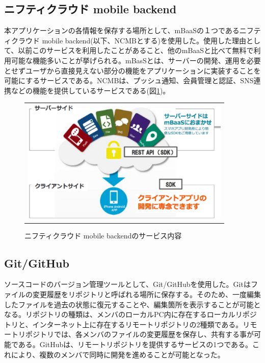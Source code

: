 \subsection{ニフティクラウド mobile backend}%
本アプリケーションの各情報を保存する場所として、mBaaSの１つであるニフティクラウド mobile backend(以下、NCMBとする)を使用した。使用した理由として、以前このサービスを利用したことがあること、他のmBaaSと比べて無料で利用可能な機能多いことが挙げられる。mBasSとは、サーバーの開発、運用を必要とせずユーザから直接見えない部分の機能をアプリケーションに実装することを可能にするサービスである\cite{about_mbaas}。NCMBは、プッシュ通知、会員管理と認証、SNS連携などの機能\cite{price_mbaas}を提供しているサービスである(図\ref{fig:image_mbaas})。

\begin{figure}[htbp]
  \begin{center}
    \begin{tabular}{c}

      \begin{minipage}{0.7\hsize}
        \begin{center}
\includegraphics[width=10cm]{ncmb_overview.eps}
          \hspace{1cm} %
        \end{center}
      \end{minipage}

    \end{tabular}
    \caption{ニフティクラウド mobile backendのサービス内容\cite{intro_mbaas}}
    \label{fig:image_mbaas}
  \end{center}
\end{figure}


\subsection{Git/GitHub}%
ソースコードのバージョン管理ツールとして、Git/GitHubを使用した。Gitはファイルの変更履歴をリポジトリと呼ばれる場所に保存する。そのため、一度編集したファイルを過去の状態に復元することや、編集箇所を表示することが可能となる\cite{book_about_github}。リポジトリの種類は、メンバのローカルPC内に存在するローカルリポジトリと、インターネット上に存在するリモートリポジトリの2種類である\cite{monkey_git}。リモートリポジトリでは、各メンバのファイルの変更履歴を保存し、共有する事が可能である。GitHubは、リモートリポジトリを提供するサービスの1つである。これにより、複数のメンバで同時に開発を進めることが可能となった。


